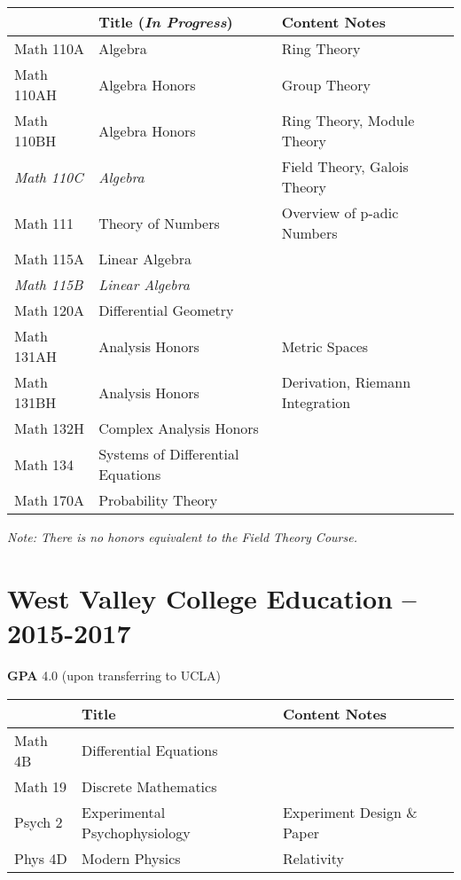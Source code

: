 \documentclass[11pt]{article}
\begin{document}
\begin{tabular}{l l l}
\hline
 & Title (\textit{In Progress}) & Content Notes \\
\hline
Math 110A & Algebra & Ring Theory \\
Math 110AH & Algebra Honors & Group Theory \\
Math 110BH & Algebra Honors & Ring Theory, Module Theory \\
\textit{Math 110C} & \textit{Algebra} & Field Theory, Galois Theory \\
Math 111 & Theory of Numbers & Overview of p-adic Numbers \\
Math 115A & Linear Algebra & \\
\textit{Math 115B} & \textit{Linear Algebra} & \\
Math 120A & Differential Geometry & \\
Math 131AH & Analysis Honors & Metric Spaces \\
Math 131BH & Analysis Honors & Derivation, Riemann Integration \\
Math 132H & Complex Analysis Honors & \\
Math 134 & Systems of Differential Equations & \\
Math 170A & Probability Theory & \\
\hline
\end{tabular}

\textit{Note: There is no honors equivalent to the Field Theory Course.}

\section{West Valley College Education -- 2015-2017}

\textbf{GPA} 4.0 (upon transferring to UCLA)

\begin{tabular}{|l l l|}
\hline
 & Title & Content Notes \\
\hline
Math 4B & Differential Equations & \\
Math 19 & Discrete Mathematics & \\
Psych 2 & Experimental Psychophysiology & Experiment Design \& Paper \\
Phys 4D & Modern Physics & Relativity \\
\hline
\end{tabular}
\end{document}
